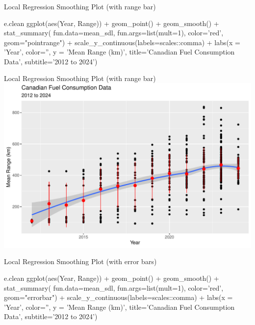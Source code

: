 \documentclass[ignorenonframetext,xcolor=x11names]{beamer}
\begin{document}
\begin{frame}[fragile]{Local Regression Smoothing Plot (with range bar)}
\footnotesize
\begin{Rcode}
e.clean %
  ggplot(aes(Year, Range)) +
    geom_point() +
    geom_smooth() +
    stat_summary(
       fun.data=mean_sdl, 
       fun.args=list(mult=1), 
       color='red', 
       geom="pointrange") +
    scale_y_continuous(labels=scales::comma) + 
    labs(x = 'Year', color='', y = 'Mean Range (km)', 
    title='Canadian Fuel Consumption Data', 
    subtitle='2012 to 2024')
\end{Rcode}
\end{frame}

\begin{frame}{Local Regression Smoothing Plot (with range bar)}
  \includegraphics[width=\textwidth]{fuel.linesSmoothPointRange.pdf}
\end{frame}

\begin{frame}[fragile]{Local Regression Smoothing Plot (with error bars)}
\footnotesize
\begin{Rcode}
e.clean %
  ggplot(aes(Year, Range)) +
    geom_point() +
    geom_smooth() +
    stat_summary(
        fun.data=mean_sdl, 
        fun.args=list(mult=1), 
        color='red', 
        geom="errorbar") +
    scale_y_continuous(labels=scales::comma) + 
    labs(x = 'Year', color='', y = 'Mean Range (km)', 
    title='Canadian Fuel Consumption Data', 
    subtitle='2012 to 2024')
\end{Rcode}
\end{frame}
\end{document}
